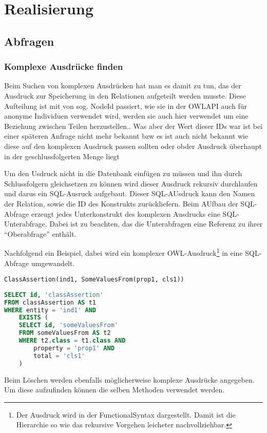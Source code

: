 \chapter{Realisierung}



\section{Abfragen}
\subsection{Komplexe Ausdrücke finden}
Beim Suchen von komplexen Ausdrücken hat man es damit zu tun, das der Ausdruck zur Speicherung in den Relationen aufgeteilt werden musste. Diese Aufteilung ist mit von sog. NodeId passiert, wie sie in der OWLAPI auch für anonyme Individuen verwendet wird, werden sie auch hier verwendet um eine Beziehung zwischen Teilen herzustellen.. Was aber der Wert dieser IDs war ist bei einer späteren Anfrage nicht mehr bekannt bzw es ist auch nicht bekannt wie diese auf den komplexen Ausdruck passen sollten oder obder Ausdruck überhaupt in der geschlussfolgerten Menge liegt

Um den Usdruck nicht in die Datenbank einfügen zu müssen und ihn durch Schlussfolgern gleichsetzen zu können wird dieser Ausdruck rekursiv durchlaufen und darus ein SQL-Ausruck aufgebaut. Dieser SQL-AUsdruck kann den Namen der Relation, sowie die ID des Konstrukts zurückliefern. Beim AUfbau der SQL-Abfrage erzeugt jedes Unterkonstrukt des komplexen Ausdrucks eine SQL-Unterabfrage. Dabei ist zu beachten, das die Unterabfragen eine Referenz zu ihrer ``Oberabfrage'' enthält.

Nachfolgend ein Beispiel, dabei wird ein komplexer OWL-Ausdruck\footnote{Der Ausdruck wird in der FunctionalSyntax dargestellt. Damit ist die Hierarchie so wie das rekursive Vorgehen leicheter nachvollziehbar.} in eine SQL-Abfrage umgewandelt.

\begin{verbatim}
ClassAssertion(ind1, SomeValuesFrom(prop1, cls1))
\end{verbatim}

\begin{lstlisting}[language=SQL]
SELECT id, 'classAssertion'
FROM classAssertion AS t1
WHERE entity = 'ind1' AND
	EXISTS (
	SELECT id, 'someValuesFrom'
	FROM someValuesFrom AS t2
	WHERE t2.class = t1.class AND
		property = 'prop1' AND
		total = 'cls1'
	)
\end{lstlisting}


Beim Löschen werden ebenfalls möglicherweise komplexe Ausdrücke angegeben. Um diese aufzufinden können die selben Methoden verwendet werden.





